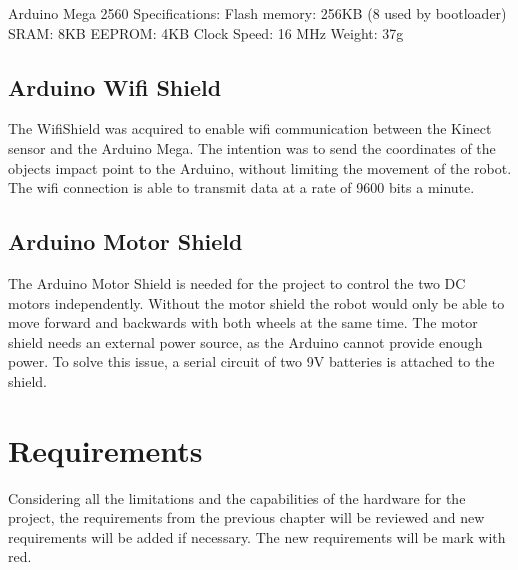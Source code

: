 Arduino Mega 2560 Specifications:\newline
Flash memory: 256KB (8 used by bootloader)\newline
SRAM: 8KB\newline
EEPROM: 4KB\newline
Clock Speed: 16 MHz\newline
Weight: 37g

\subsection{Arduino Wifi Shield}
\label{sec: Arduino Wifi Shield}
The WifiShield was acquired to enable wifi communication between the Kinect sensor and the Arduino Mega. The intention was to send the coordinates of the objects impact point to the Arduino, without limiting the movement of the robot. The wifi connection is able to transmit data at a rate of 9600 bits a minute. 
\citep{aws}

\subsection{Arduino Motor Shield}
\label{sec:Arduino Motor Shield}
The Arduino Motor Shield is needed for the project to control the two DC motors independently. Without the motor shield the robot would only be able to move forward and backwards with both wheels at the same time. 
The motor shield needs an external power source, as the Arduino cannot provide enough power. To solve this issue, a serial circuit of two 9V batteries is attached to the shield. \citep{ams}

\section{Requirements}
\label{sec:HWrequirements}
Considering all the limitations and the capabilities of the hardware for the project, the requirements from the previous chapter will be reviewed and new requirements will be added if necessary. The new requirements will be mark with red. 


